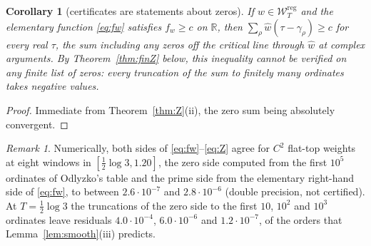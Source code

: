 \documentclass[11pt]{amsart}
\newtheorem{corollary}[theorem]{Corollary}
\theoremstyle{definition}
\theoremstyle{remark}
\newtheorem{remark}[theorem]{Remark}
\newcommand{\R}{\mathbb R}
\newcommand{\wh}{\widehat w}
\newcommand{\Wcl}{\mathcal W_T}
\begin{document}
\begin{corollary}[certificates are statements about zeros]\label{cor:zeros}
If $w\in\Wcl^{\mathrm{reg}}$ and the elementary function \eqref{eq:fw} satisfies $f_w\ge c$ on $\R$,
then $\sum_\rho\wh(\tau-\gamma_\rho)\ge c$ for every real $\tau$, the sum including any zeros off the
critical line through $\wh$ at complex arguments. By Theorem~\ref{thm:finZ} below, this inequality
cannot be verified on any finite list of zeros: every truncation of the sum to finitely many
ordinates takes negative values.
\end{corollary}
\begin{proof}
Immediate from Theorem~\ref{thm:Z}(ii), the zero sum being absolutely convergent.
\end{proof}

\begin{remark}\label{rem:Zcheck}
Numerically, both sides of \eqref{eq:fw}--\eqref{eq:Z} agree for $C^2$ flat-top weights at eight
windows in $[\frac12\log3,1.20]$, the zero side computed from the first $10^5$ ordinates of Odlyzko's
table and the prime side from the elementary right-hand side of \eqref{eq:fw}, to between
$2.6\cdot10^{-7}$ and $2.8\cdot10^{-6}$ (double precision, not certified). At $T=\frac12\log3$ the
truncations of the zero side to the first $10$, $10^2$ and $10^3$ ordinates leave residuals
$4.0\cdot10^{-4}$, $6.0\cdot10^{-6}$ and $1.2\cdot10^{-7}$, of the orders that Lemma~\ref{lem:smooth}(iii)
predicts.
\end{remark}
\end{document}
